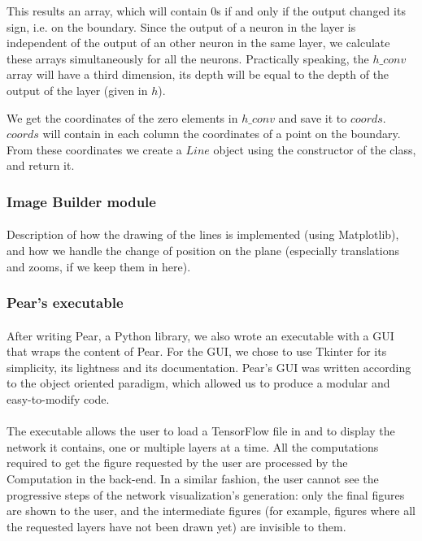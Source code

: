 \documentclass[a4paper]{article}
\begin{document}
This results an array, which will contain $0$s if and only if the output changed its sign, i.e. on the boundary. Since the output of a neuron in the layer is independent of the output of an other neuron in the same layer, we calculate these arrays simultaneously for all the neurons. Practically speaking, the $h\_conv$ array will have a third dimension, its depth will be equal to the depth of the output of the layer (given in $h$).

We get the coordinates of the zero elements in $h\_conv$ and save it to $coords$. $coords$ will contain in each column the coordinates of a point on the boundary.
From these coordinates we create a $Line$ object using the constructor of the class, and return it.

\subsubsection{Image Builder module}
\paragraph{}Description of how the drawing of the lines is implemented (using Matplotlib), and how we handle the change of position on the plane (especially translations and zooms, if we keep them in here).


\subsubsection{Pear's executable}
\paragraph{}After writing Pear, a Python library, we also wrote an executable with a GUI that wraps the content of Pear. For the GUI, we chose to use Tkinter for its simplicity, its lightness and its documentation. Pear's GUI was written according to the object oriented paradigm, which allowed us to produce a modular and easy-to-modify code.

\paragraph{}The executable allows the user to load a TensorFlow file in and to display the network it contains, one or multiple layers at a time. All the computations required to get the figure requested by the user are processed by the Computation in the back-end. In a similar fashion, the user cannot see the progressive steps of the network visualization's generation: only the final figures are shown to the user, and the intermediate figures (for example, figures where all the requested layers have not been drawn yet) are invisible to them.
\end{document}
